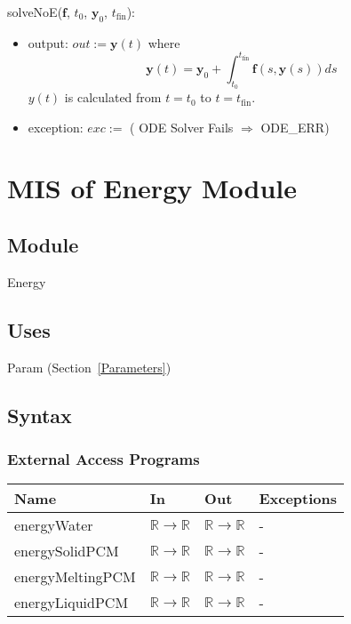 \documentclass[12pt, titlepage]{article}
\begin{document}
solveNoE($\textbf{f}$, $t_0$, $\textbf{y}_0$, $t_\text{fin}$): 
\begin{itemize}
\item output: $out := \textbf{y}(t)$ where 
$$\textbf{y}(t) = \textbf{y}_0 + \int_{t_0}^{t_\text{fin}} \textbf{f}(s, \textbf{y}(s)) ds$$ 
$y(t)$ is calculated from $t = t_0$ to $t = t_\text{fin}$.
\item exception: $exc :=$ ( ODE Solver Fails $\Rightarrow$ ODE\_ERR)
\end{itemize}

\newpage
\section{MIS of Energy Module} \label{Energy}

\subsection{Module}

Energy

\subsection{Uses}

Param (Section~\ref{Parameters})

\subsection{Syntax}

\subsubsection{External Access Programs}

\begin{center}
\begin{tabular}{p{4cm} p{4cm} p{3cm} p{2cm}}
\hline
\textbf{Name} & \textbf{In} & \textbf{Out} & \textbf{Exceptions} \\
\hline
energyWater & $\mathbb{R} \rightarrow \mathbb{R}$ & $\mathbb{R} \rightarrow \mathbb{R}$ & - \\
\hline
energySolidPCM & $\mathbb{R} \rightarrow \mathbb{R}$ & $\mathbb{R} \rightarrow \mathbb{R}$ & - \\
\hline
energyMeltingPCM & $\mathbb{R} \rightarrow \mathbb{R}$ & $\mathbb{R} \rightarrow \mathbb{R}$ & - \\
\hline
energyLiquidPCM & $\mathbb{R} \rightarrow \mathbb{R}$ & $\mathbb{R} \rightarrow \mathbb{R}$ & - \\
\hline
\end{tabular}
\end{center}
\end{document}
